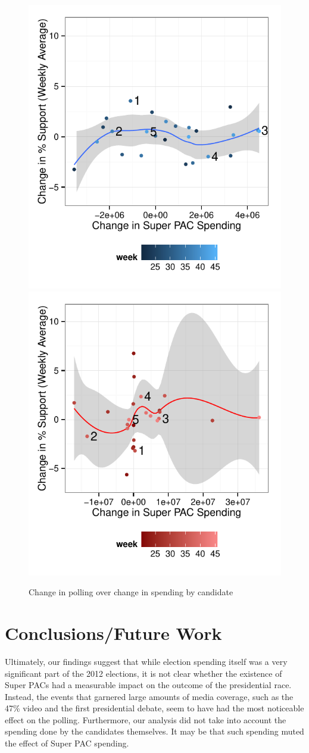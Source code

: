 \documentclass[11pt]{article}\usepackage{graphicx, color}
\newenvironment{knitrout}{}{} %
\begin{document}
\begin{knitrout}
\color{fgcolor}\begin{figure}[H]
\includegraphics[width=.45\textwidth]{figure/support_spend1} \includegraphics[width=.45\textwidth]{figure/support_spend2} \caption[Change in polling over change in spending by candidate]{Change in polling over change in spending by candidate\label{fig:support_spend}}
\end{figure}

\end{knitrout}


\section{Conclusions/Future Work}
Ultimately, our findings suggest that while election spending itself was a very significant part of the 2012 elections, it is not clear whether the existence of Super PACs had a measurable impact on the outcome of the presidential race. Instead, the events that garnered large amounts of media coverage, such as the 47\% video and the first presidential debate, seem to have had the most noticeable effect on the polling. Furthermore, our analysis did not take into account the spending done by the candidates themselves. It may be that such spending muted the effect of Super PAC spending.
\end{document}
